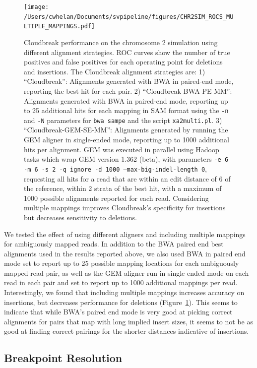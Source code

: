 \begin{figure}
\centering
\texttt{[image: /Users/cwhelan/Documents/svpipeline/figures/CHR2SIM\_ROCS\_MULTIPLE\_MAPPINGS.pdf]}
\caption{Cloudbreak performance on the chromosome 2 simulation using different alignment strategies. ROC curves show the number of true positives and false positives for each operating point for deletions and insertions. The Cloudbreak alignment strategies are: 1) ``Cloudbreak'': Alignments generated with BWA in paired-end mode, reporting the best hit for each pair. 2) ``Cloudbreak-BWA-PE-MM'': Alignments generated with BWA in paired-end mode, reporting up to 25 additional hits for each mapping in SAM format using the \texttt{-n} and \texttt{-N} parameters for \texttt{bwa sampe} and the script \texttt{xa2multi.pl}. 3) ``Cloudbreak-GEM-SE-MM'': Alignments generated by running the GEM aligner in single-ended mode, reporting up to 1000 additional hits per alignment. GEM was executed in parallel using Hadoop tasks which wrap GEM version 1.362 (beta), with parameters \texttt{-e 6 -m 6 -s 2 -q ignore -d 1000 --max-big-indel-length 0},  requesting all hits for a read that are within an edit distance of 6 of the reference, within 2 strata of the best hit, with a maximum of 1000 possible alignments reported for each read. Considering multiple mappings improves Cloudbreak's specificity for insertions but decreases sensitivity to deletions.}
\label{alignment_comparison}
\end{figure}

We tested the effect of using different aligners and including multiple mappings for ambiguously mapped reads. In addition to the BWA paired end best alignments used in the results reported above, we also used BWA in paired end mode set to report up to 25 possible mapping locations for each ambiguously mapped read pair, as well as the GEM aligner run in single ended mode on each read in each pair and set to report up to 1000 additional mappings per read. Interestingly, we found that including multiple mappings increases accuracy on insertions, but decreases performance for deletions (Figure~\ref{alignment_comparison}). This seems to indicate that while BWA's paired end mode is very good at picking correct alignments for pairs that map with long implied insert sizes, it seems to not be as good at finding correct pairings for the shorter distances indicative of insertions.

\subsection{Breakpoint Resolution}

